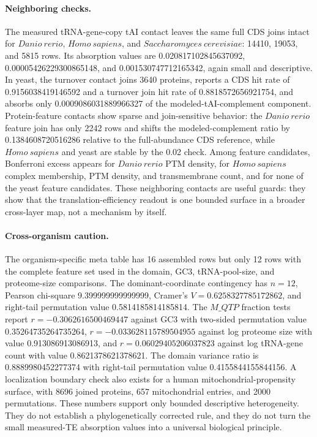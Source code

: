 \paragraph{Neighboring checks.}
The measured tRNA-gene-copy tAI contact leaves the same full CDS joins intact for $Danio\ rerio$, $Homo\ sapiens$, and $Saccharomyces\ cerevisiae$: 14410, 19053, and 5815 rows.  Its absorption values are 0.020817102845637092, 0.00005426229300865148, and 0.001530747712165342, again small and descriptive.  In yeast, the turnover contact joins 3640 proteins, reports a CDS hit rate of 0.9156038419146592 and a turnover join hit rate of 0.8818572656921754, and absorbs only 0.0009086031889966327 of the modeled-tAI-complement component.  Protein-feature contacts show sparse and join-sensitive behavior: the $Danio\ rerio$ feature join has only 2242 rows and shifts the modeled-complement ratio by 0.1384608720516286 relative to the full-abundance CDS reference, while $Homo\ sapiens$ and yeast are stable by the 0.02 check.  Among feature candidates, Bonferroni excess appears for $Danio\ rerio$ PTM density, for $Homo\ sapiens$ complex membership, PTM density, and transmembrane count, and for none of the yeast feature candidates.  These neighboring contacts are useful guards: they show that the translation-efficiency readout is one bounded surface in a broader cross-layer map, not a mechanism by itself.

\paragraph{Cross-organism caution.}
The organism-specific meta table has 16 assembled rows but only 12 rows with the complete feature set used in the domain, GC3, tRNA-pool-size, and proteome-size comparisons.  The dominant-coordinate contingency has $n=12$, Pearson chi-square 9.399999999999999, Cramer's $V=0.6258327785172862$, and right-tail permutation value 0.5814185814185814.  The $M\_{QTP}$ fraction tests report $r=-0.3062616500469447$ against GC3 with two-sided permutation value 0.35264735264735264, $r=-0.033628115789504955$ against log proteome size with value 0.913086913086913, and $r=0.06029405206037823$ against log tRNA-gene count with value 0.8621378621378621.  The domain variance ratio is 0.8889980452277374 with right-tail permutation value 0.4155844155844156.  A localization boundary check also exists for a human mitochondrial-propensity surface, with 8696 joined proteins, 657 mitochondrial entries, and 2000 permutations.  These numbers support only bounded descriptive heterogeneity.  They do not establish a phylogenetically corrected rule, and they do not turn the small measured-TE absorption values into a universal biological principle.

